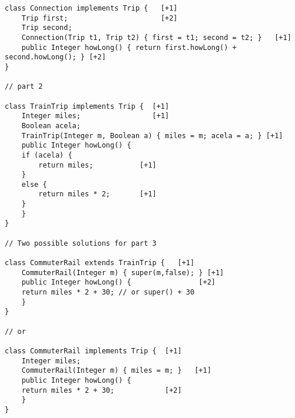 \documentclass[12pt]{article}                   %
\newenvironment{solution}{}{}
\begin{document}
\begin{problem}
\begin{solution}
\begin{verbatim}
class Connection implements Trip {   [+1]
    Trip first;                      [+2]
    Trip second;
    Connection(Trip t1, Trip t2) { first = t1; second = t2; }   [+1]
    public Integer howLong() { return first.howLong() + second.howLong(); } [+2]
}

// part 2

class TrainTrip implements Trip {  [+1]
    Integer miles;                 [+1]
    Boolean acela;
    TrainTrip(Integer m, Boolean a) { miles = m; acela = a; } [+1]
    public Integer howLong() { 
	if (acela) {
	    return miles;           [+1]
	}
	else {
	    return miles * 2;       [+1]
	}
    }
}

// Two possible solutions for part 3

class CommuterRail extends TrainTrip {   [+1]
    CommuterRail(Integer m) { super(m,false); } [+1]
    public Integer howLong() {                [+2]
	return miles * 2 + 30; // or super() + 30
    }
}

// or 

class CommuterRail implements Trip {  [+1]
    Integer miles;
    CommuterRail(Integer m) { miles = m; }   [+1]
    public Integer howLong() { 
	return miles * 2 + 30;            [+2]
    }
}

\end{verbatim}
\end{solution}
\end{problem}
\newpage
\end{document}
